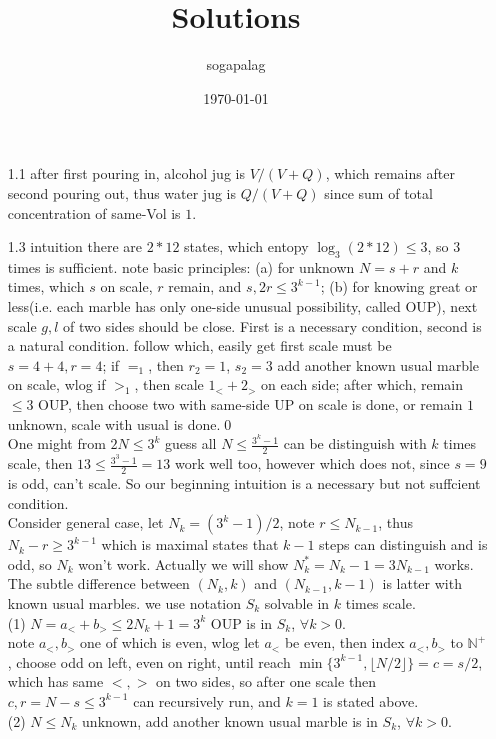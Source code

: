 \documentclass[paper=a4, fontsize=11pt]{scrartcl} %
\title{Solutions}
\author{sogapalag}
\date{\normalsize\today}
\numberwithin{equation}{section} %
\numberwithin{figure}{section} %
\numberwithin{table}{section} %
\begin{document}
\maketitle

\begin{itemize}
	\item[1.1] after first pouring in, alcohol jug is $V/(V+Q)$, which remains after second pouring out, thus water jug is $Q/(V+Q)$ since sum of total concentration of same-Vol is $1$.
	\item[1.3] intuition there are $2*12$ states, which entopy $\log_3 (2*12)\leq 3$, so $3$ times is sufficient. note basic principles: (a) for unknown $N=s+r$ and $k$ times, which $s$ on scale, $r$ remain, and $s,2r \leq 3^{k-1}$; (b) for knowing great or less(i.e. each marble has only one-side unusual possibility, called OUP), next scale $g,l$ of two sides should be close. First is a necessary condition, second is a natural condition. follow which, easily get first scale must be $s=4+4,r=4$; if $=_1$, then $r_2=1$, $s_2=3$ add another known usual marble on scale, wlog if $>_1$, then scale $1_< + 2_>$ on each side; after which, remain $\leq 3$ OUP, then choose two with same-side UP on scale is done, or remain $1$ unknown, scale with usual is done.\qed\\
	One might from $2N\leq 3^k$ guess all $N\leq \frac{3^k-1}{2}$ can be distinguish with $k$ times scale, then $13\leq \frac{3^3-1}{2}=13$ work well too, however which does not, since $s=9$ is odd, can't scale. So our beginning intuition is a necessary but not suffcient condition.\\
	Consider general case, let $N_k = (3^k-1)/2$, note $r\leq N_{k-1}$, thus $N_k-r\geq 3^{k-1}$ which is maximal states that $k-1$ steps can distinguish and is odd, so $N_k$ won't work. Actually we will show $N_k^* = N_k-1 = 3N_{k-1}$ works. The subtle difference between $(N_k,k)$ and $(N_{k-1},k-1)$ is latter with known usual marbles. we use notation $S_k$ solvable in $k$ times scale.\\
	(1) $N=a_<+b_>\leq 2N_k+1=3^k$ OUP is in $S_k$, $\forall k>0$.\\
	note $a_<,b_>$ one of which is even, wlog let $a_<$ be even, then index $a_<,b_>$ to $\mathbb{N}^+$, choose odd on left, even on right, until reach $\min\{3^{k-1}, \lfloor N/2\rfloor\} =c=s/2$, which has same $<,>$ on two sides, so after one scale then $c,r=N-s \leq 3^{k-1}$ can recursively run, and $k=1$ is stated above.\\
	(2) $N\leq N_k$ unknown, add another known usual marble is in $S_k$, $\forall k>0$.\\

\end{itemize}
\end{document}
